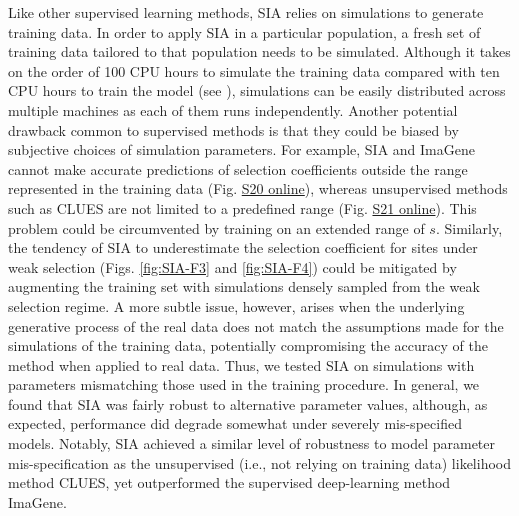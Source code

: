 Like other supervised learning methods, \ac{SIA} relies on simulations to generate training data. In order to apply \ac{SIA} in a particular population, a fresh set of training data tailored to that population needs to be simulated. Although it takes on the order of 100 CPU hours to simulate the training data compared with ten CPU hours to train the model (see ), simulations can be easily distributed across multiple machines as each of them runs independently. Another potential drawback common to supervised methods is that they could be biased by subjective choices of simulation parameters. For example, \ac{SIA} and ImaGene cannot make accurate predictions of selection coefficients outside the range represented in the training data (Fig. \href{https://academic.oup.com/mbe/article/39/1/msab332/6433161?login=true#supplementary-data}{S20 online}), whereas unsupervised methods such as CLUES are not limited to a predefined range (Fig. \href{https://academic.oup.com/mbe/article/39/1/msab332/6433161?login=true#supplementary-data}{S21 online}). This problem could be circumvented by training on an extended range of $s$. Similarly, the tendency of \ac{SIA} to underestimate the selection coefficient for sites under weak selection (Figs. \ref{fig:SIA-F3} and \ref{fig:SIA-F4}) could be mitigated by augmenting the training set with simulations densely sampled from the weak selection regime. A more subtle issue, however, arises when the underlying generative process of the real data does not match the assumptions made for the simulations of the training data, potentially compromising the accuracy of the method when applied to real data. Thus, we tested \ac{SIA} on simulations with parameters mismatching those used in the training procedure. In general, we found that \ac{SIA} was fairly robust to alternative parameter values, although, as expected, performance did degrade somewhat under severely mis-specified models. Notably, \ac{SIA} achieved a similar level of robustness to model parameter mis-specification as the unsupervised (i.e., not relying on training data) likelihood method CLUES, yet outperformed the supervised deep-learning method ImaGene.

